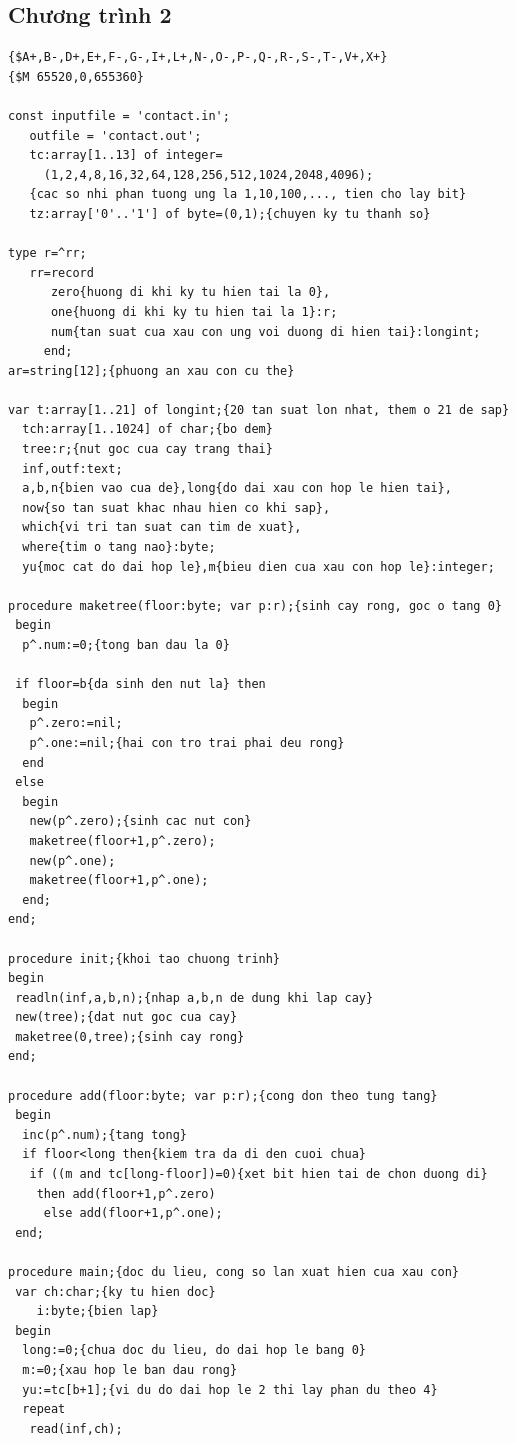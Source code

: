 \documentclass[11pt]{article}
\begin{document}
\subsection*{Chương trình 2}

\begin{verbatim}
{$A+,B-,D+,E+,F-,G-,I+,L+,N-,O-,P-,Q-,R-,S-,T-,V+,X+}
{$M 65520,0,655360}

const inputfile = 'contact.in';
   outfile = 'contact.out';
   tc:array[1..13] of integer=
     (1,2,4,8,16,32,64,128,256,512,1024,2048,4096);
   {cac so nhi phan tuong ung la 1,10,100,..., tien cho lay bit}
   tz:array['0'..'1'] of byte=(0,1);{chuyen ky tu thanh so}

type r=^rr;
   rr=record
      zero{huong di khi ky tu hien tai la 0},
      one{huong di khi ky tu hien tai la 1}:r;
      num{tan suat cua xau con ung voi duong di hien tai}:longint;
     end;
ar=string[12];{phuong an xau con cu the}

var t:array[1..21] of longint;{20 tan suat lon nhat, them o 21 de sap}
  tch:array[1..1024] of char;{bo dem}
  tree:r;{nut goc cua cay trang thai}
  inf,outf:text;
  a,b,n{bien vao cua de},long{do dai xau con hop le hien tai},
  now{so tan suat khac nhau hien co khi sap},
  which{vi tri tan suat can tim de xuat},
  where{tim o tang nao}:byte;
  yu{moc cat do dai hop le},m{bieu dien cua xau con hop le}:integer;

procedure maketree(floor:byte; var p:r);{sinh cay rong, goc o tang 0}
 begin
  p^.num:=0;{tong ban dau la 0}

 if floor=b{da sinh den nut la} then
  begin
   p^.zero:=nil;
   p^.one:=nil;{hai con tro trai phai deu rong}
  end
 else
  begin
   new(p^.zero);{sinh cac nut con}
   maketree(floor+1,p^.zero);
   new(p^.one);
   maketree(floor+1,p^.one);
  end;
end;

procedure init;{khoi tao chuong trinh}
begin
 readln(inf,a,b,n);{nhap a,b,n de dung khi lap cay}
 new(tree);{dat nut goc cua cay}
 maketree(0,tree);{sinh cay rong}
end;

procedure add(floor:byte; var p:r);{cong don theo tung tang}
 begin
  inc(p^.num);{tang tong}
  if floor<long then{kiem tra da di den cuoi chua}
   if ((m and tc[long-floor])=0){xet bit hien tai de chon duong di}
    then add(floor+1,p^.zero)
     else add(floor+1,p^.one);
 end;

procedure main;{doc du lieu, cong so lan xuat hien cua xau con}
 var ch:char;{ky tu hien doc}
    i:byte;{bien lap}
 begin
  long:=0;{chua doc du lieu, do dai hop le bang 0}
  m:=0;{xau hop le ban dau rong}
  yu:=tc[b+1];{vi du do dai hop le 2 thi lay phan du theo 4}
  repeat
   read(inf,ch);


\end{verbatim}
\end{document}
